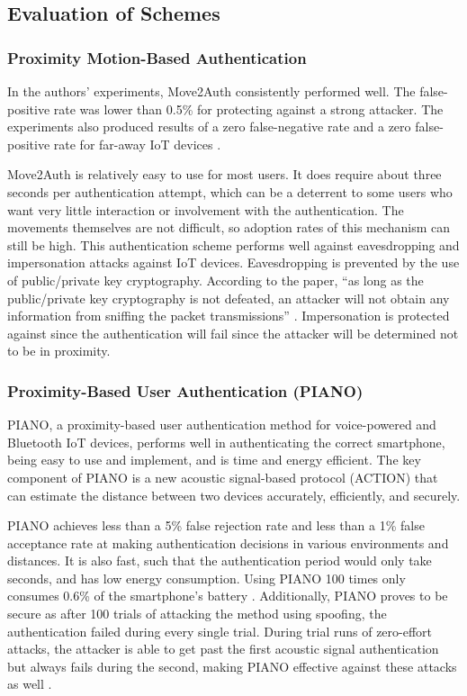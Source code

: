 \documentclass[10pt,twocolumn,letterpaper]{article}
\begin{document}
\subsection{Evaluation of Schemes}

\subsubsection{Proximity Motion-Based Authentication}
In the authors’ experiments, Move2Auth consistently performed well. The false-positive rate was lower than 0.5\% for protecting against a strong attacker. The experiments also produced results of a zero false-negative rate and a zero false-positive rate for far-away IoT devices \cite{proxmotion}.

Move2Auth is relatively easy to use for most users. It does require about three seconds per authentication attempt, which can be a deterrent to some users who want very little interaction or involvement with the authentication. The movements themselves are not difficult, so adoption rates of this mechanism can still be high.
This authentication scheme performs well against eavesdropping and impersonation attacks against IoT devices. Eavesdropping is prevented by the use of public/private key cryptography. According to the paper, “as long as the public/private key cryptography is not defeated, an attacker will not obtain any information from sniffing the packet transmissions” \cite{proxmotion}. Impersonation is protected against since the authentication will fail since the attacker will be determined not to be in proximity.

\subsubsection{Proximity-Based User Authentication (PIANO)}

PIANO, a proximity-based user authentication method for voice-powered and Bluetooth IoT devices, performs well in authenticating the correct smartphone, being easy to use and implement, and is time and energy efficient. The key component of PIANO is a new acoustic signal-based protocol (ACTION) that can estimate the distance between two devices accurately, efficiently, and securely.

PIANO achieves less than a 5\% false rejection rate and less than a 1\% false acceptance rate at making authentication decisions in various environments and distances. It is also fast, such that the authentication period would only take seconds, and has low energy consumption. Using PIANO 100 times only consumes 0.6\% of the smartphone’s battery \cite{piano}. Additionally, PIANO proves to be secure as after 100 trials of attacking the method using spoofing, the authentication failed during every single trial. During trial runs of zero-effort attacks, the attacker is able to get past the first acoustic signal authentication but always fails during the second, making PIANO effective against these attacks as well \cite{piano}.
\end{document}
